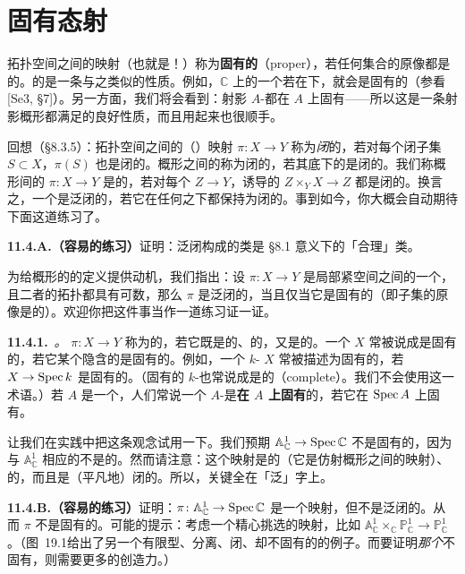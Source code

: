 
\section{固有态射}

拓扑空间之间的映射（也就是\trContinuousMap！）称为\textbf{固有的}（proper），若任何\trCompact{}集合的原像都是\trCompact{}的。\trMorphism{}的\trProperness{}是一条与之类似的性质。例如，$\mathbb{C}$ 上的一个\trVariety{}若在\trClassicalTopology{}下\trCompact{}，就会是固有的（参看 [Se3, \S7]）。另一方面，我们将会看到：射影 $A$-\trScheme{}都在 $A$ 上固有——所以这是一条射影概形都满足的良好性质，而且用起来也很顺手。

回想（\S8.3.5）：拓扑空间之间的（\trContinuous）映射 $\pi\colon X\to Y$ 称为\emph{闭}的，若对每个闭子集 $S\subset X$，$\pi(S)$ 也是闭的。概形之间的\trMorphism{}称为闭的，若其底下的\trContinuousMap{}是闭的。我们称概形间的\trMorphism{} $\pi\colon X\to Y$ 是\trUniversallyClosed{}的，若对每个\trMorphism{} $Z\to Y$，诱导的\trMorphism{} $Z\times_Y X\to Z$ 都是闭的。换言之，一个\trMorphism{}是泛闭的，若它在任何\trBaseChange{}之下都保持为闭的。事到如今，你大概会自动期待下面这道练习了。

\textbf{11.4.A.（容易的练习）}\quad 证明：泛闭\trMorphism{}构成的类是 \S8.1 意义下的「合理」类。

为给概形的\trProperness{}的定义提供动机，我们指出：设 $\pi\colon X\to Y$ 是局部紧\trHausdorff{}空间之间的一个\trContinuousMap，且二者的拓扑都具有可数\trBase，那么 $\pi$ 是泛闭的，当且仅当它是固有的（即\trCompact{}子集的原像是\trCompact{}的）。欢迎你把这件事当作一道练习证一证。

\textbf{11.4.1.}\ \emph{\trhDefinition{}。}\quad \trMorphism{} $\pi\colon X\to Y$ 称为\textbf{\trProper}的，若它既是\trSeparated{}的、\trFiniteType{}的，又是\trUniversallyClosed{}的。一个\trScheme{} $X$ 常被说成是固有的，若它某个隐含的\trStructureMorphism{}是固有的。例如，一个 $k$-\trScheme{} $X$ 常被描述为固有的，若 $X\to\operatorname{Spec} k$ 是固有的。（固有的 $k$-\trScheme{}也常说成是\textbf{\trComplete}的（complete）。我们不会使用这一术语。）若 $A$ 是一个\trRing，人们常说一个 $A$-\trScheme{}是\textbf{在 $A$ 上固有}的，若它在 $\operatorname{Spec} A$ 上固有。

让我们在实践中把这条观念试用一下。我们预期 $\mathbb{A}^1_{\mathbb{C}}\to\operatorname{Spec}\mathbb{C}$ 不是固有的，因为与 $\mathbb{A}^1_{\mathbb{C}}$ 相应的\trComplex\trManifold{}不是\trCompact{}的。然而请注意：这个映射是\trSeparated{}的（它是仿射概形之间的映射）、\trFiniteType{}的，而且是（平凡地）闭的。所以，关键全在「泛」字上。

\textbf{11.4.B.（容易的练习）}\quad 证明：$\pi\colon\mathbb{A}^1_{\mathbb{C}}\to\operatorname{Spec}\mathbb{C}$ 是一个\trClosed{}映射，但不是泛闭的。从而 $\pi$ 不是固有的。可能的提示：考虑一个精心挑选的映射，比如 $\mathbb{A}^1_{\mathbb{C}}\times_{\mathbb{C}}\mathbb{P}^1_{\mathbb{C}}\to\mathbb{P}^1_{\mathbb{C}}$。（\mbox{图~19.1}给出了另一个有限型、分离、闭、却不固有的\trMorphism{}的例子。而要证明\emph{那个}\trMorphism{}不固有，则需要更多的创造力。）


